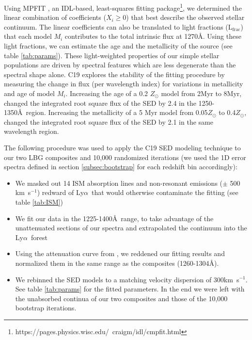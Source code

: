 \documentclass[twocolumn,tight,times]{aastex63}
\newcommand{\lya}{Ly$\alpha$}
\newcommand{\kms}{km~s$^{-1}$}
\begin{document}
Using MPFIT \citep{Markwardt_2009}, an IDL-based, least-squares fitting package\footnote{https://pages.physics.wisc.edu/~craigm/idl/cmpfit.html}, we determined the linear combination of coefficients ($X_{i} \geq 0$) that best describe the observed stellar continuum. The linear coefficients can also be translated to light fractions ($\mathrm{L_{frac}}$) that each model $M_{i}$ contributes to the total intrinsic flux at 1270\AA. Using these light fractions, we can estimate the age and the metallicity of the source (see table \ref{tab:params}). These light-weighted properties of our simple stellar populations are driven by spectral features which are less degenerate than the spectral shape alone. C19 explores the stability of the fitting procedure by measuring the change in flux (per wavelength index) for variations in metallicity and age of model $M_{i}$. Increasing the age of a 0.2 $Z_{\odot}$ model from 2Myr to 8Myr, changed the integrated root square flux of the SED by 2.4 in the 1250-1350\AA\ region. Increasing the metallicity of a 5 Myr model from 0.05$Z_{\odot}$ to 0.4$Z_{\odot}$, changed the integrated root square flux of the SED by 2.1 in the same wavelength region.

The following procedure was used to apply the C19 SED modeling technique to our two LBG composites and 10,000 randomized iterations (we used the 1D error spectra defined in section \ref{subsec:bootstrap} for each redshift bin accordingly):
\begin{itemize}
    \item We masked out 14 ISM absorption lines and non-resonant emissions ($\pm$ 500 \kms) redward of \lya\ that would otherwise contaminate the fitting (see table \ref{tab:ISM})
    
    \item We fit our data in the 1225-1400\AA\ range, to take advantage of the unattenuated sections of our spectra and extrapolated the continuum into the \lya\ forest
    
    \item Using the attenuation curve from \cite{Reddy_2016}, we reddened our fitting results and normalized them in the same range as the composites (1260-1304\AA).
    
    \item We rebinned the SED models to a matching velocity dispersion of 300\kms. See table \ref{tab:params} for the fitted parameters. In the end we were left with the unabsorbed continua of our two composites and those of the 10,000 bootstrap iterations.
\end{itemize}
\end{document}

